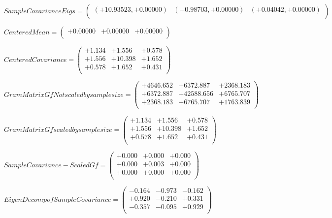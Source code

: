 \documentclass[9pt]{article}
\theoremstyle{plain}
\theoremstyle{definition}
\theoremstyle{remark}
\numberwithin{equation}{section}
\begin{document}
$Sample Covariance Eigs = \left(
\begin{array}{
ccc}
(+10.93523,+0.00000) & (+0.98703,+0.00000) & (+0.04042,+0.00000) \\
\end{array}
\right)$ \newline 

$Centered Mean = \left(
\begin{array}{
ccc}
+0.00000 & +0.00000 & +0.00000 \\
\end{array}
\right)$ \newline 

$Centered Covariance = \left(
\begin{array}{
ccc}
+1.134 & +1.556 & +0.578 \\
+1.556 & +10.398 & +1.652 \\
+0.578 & +1.652 & +0.431 \\
\end{array}
\right)$ \newline 

$Gram Matrix Gf Not scaled by sample size = \left(
\begin{array}{
ccc}
+4646.652 & +6372.887 & +2368.183 \\
+6372.887 & +42588.656 & +6765.707 \\
+2368.183 & +6765.707 & +1763.839 \\
\end{array}
\right)$ \newline 

$Gram Matrix Gf  scaled by sample size = \left(
\begin{array}{
ccc}
+1.134 & +1.556 & +0.578 \\
+1.556 & +10.398 & +1.652 \\
+0.578 & +1.652 & +0.431 \\
\end{array}
\right)$ \newline 

$SampleCovariance - Scaled Gf = \left(
\begin{array}{
ccc}
+0.000 & +0.000 & +0.000 \\
+0.000 & +0.003 & +0.000 \\
+0.000 & +0.000 & +0.000 \\
\end{array}
\right)$ \newline 

$EigenDecomp of SampleCovariance = \left(
\begin{array}{
ccc}
-0.164 & -0.973 & -0.162 \\
+0.920 & -0.210 & +0.331 \\
-0.357 & -0.095 & +0.929 \\
\end{array}
\right)$ \newline 
\end{document}
